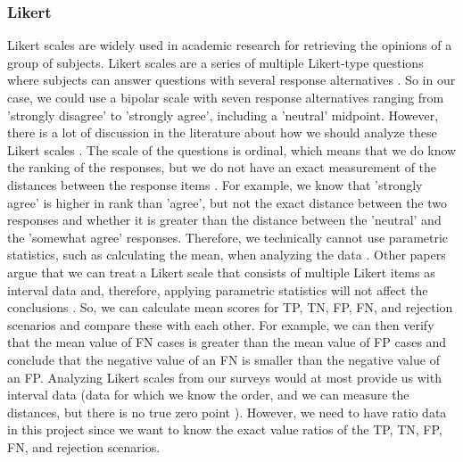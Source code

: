 \subsubsection{Likert}
\label{sec:likert}
Likert scales are widely used in academic research for retrieving the opinions of a group of subjects. Likert scales are a series of multiple Likert-type questions where subjects can answer questions with several response alternatives \cite{boone2012analyzing}. So in our case, we could use a bipolar scale with seven response alternatives ranging from 'strongly disagree' to 'strongly agree', including a 'neutral' midpoint. However, there is a lot of discussion in the literature about how we should analyze these Likert scales \cite{boone2012analyzing, allen2007likert, norman2010likert, murray2013likert}. The scale of the questions is ordinal, which means that we do know the ranking of the responses, but we do not have an exact measurement of the distances between the response items \cite{allen2007likert}. For example, we know that 'strongly agree' is higher in rank than 'agree', but not the exact distance between the two responses and whether it is greater than the distance between the 'neutral' and the 'somewhat agree' responses. Therefore, we technically cannot use parametric statistics, such as calculating the mean, when analyzing the data \cite{allen2007likert}. Other papers argue that we can treat a Likert scale that consists of multiple Likert items as interval data and, therefore, applying parametric statistics will not affect the conclusions \cite{boone2012analyzing, norman2010likert, murray2013likert}. So, we can calculate mean scores for TP, TN, FP, FN, and rejection scenarios and compare these with each other. For example, we can then verify that the mean value of FN cases is greater than the mean value of FP cases and conclude that the negative value of an FN is smaller than the negative value of an FP. Analyzing Likert scales from our surveys would at most provide us with interval data (data for which we know the order, and we can measure the distances, but there is no true zero point \cite{allen2007likert}). However, we need to have ratio data in this project since we want to know the exact value ratios of the TP, TN, FP, FN, and rejection scenarios.

